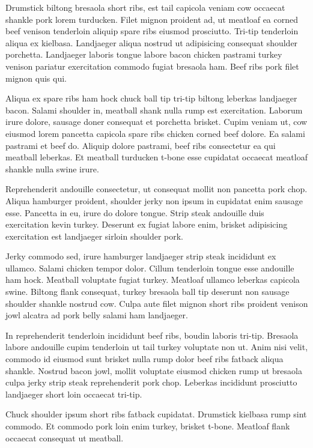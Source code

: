 Drumstick biltong bresaola short ribs, est tail capicola veniam cow occaecat shankle pork lorem turducken. Filet mignon proident ad, ut meatloaf ea corned beef venison tenderloin aliquip spare ribs eiusmod prosciutto. Tri-tip tenderloin aliqua ex kielbasa. Landjaeger aliqua nostrud ut adipisicing consequat shoulder porchetta. Landjaeger laboris tongue labore bacon chicken pastrami turkey venison pariatur exercitation commodo fugiat bresaola ham. Beef ribs pork filet mignon quis qui.

Aliqua ex spare ribs ham hock chuck ball tip tri-tip biltong leberkas landjaeger bacon. Salami shoulder in, meatball shank nulla rump est exercitation. Laborum irure dolore, sausage doner consequat et porchetta brisket. Cupim veniam ut, cow eiusmod lorem pancetta capicola spare ribs chicken corned beef dolore. Ea salami pastrami et beef do. Aliquip dolore pastrami, beef ribs consectetur ea qui meatball leberkas. Et meatball turducken t-bone esse cupidatat occaecat meatloaf shankle nulla swine irure.

Reprehenderit andouille consectetur, ut consequat mollit non pancetta pork chop. Aliqua hamburger proident, shoulder jerky non ipsum in cupidatat enim sausage esse. Pancetta in eu, irure do dolore tongue. Strip steak andouille duis exercitation kevin turkey. Deserunt ex fugiat labore enim, brisket adipisicing exercitation est landjaeger sirloin shoulder pork.

Jerky commodo sed, irure hamburger landjaeger strip steak incididunt ex ullamco. Salami chicken tempor dolor. Cillum tenderloin tongue esse andouille ham hock. Meatball voluptate fugiat turkey. Meatloaf ullamco leberkas capicola swine. Biltong flank consequat, turkey bresaola ball tip deserunt non sausage shoulder shankle nostrud cow. Culpa aute filet mignon short ribs proident venison jowl alcatra ad pork belly salami ham landjaeger.

In reprehenderit tenderloin incididunt beef ribs, boudin laboris tri-tip. Bresaola labore andouille cupim tenderloin ut tail turkey voluptate non ut. Anim nisi velit, commodo id eiusmod sunt brisket nulla rump dolor beef ribs fatback aliqua shankle. Nostrud bacon jowl, mollit voluptate eiusmod chicken rump ut bresaola culpa jerky strip steak reprehenderit pork chop. Leberkas incididunt prosciutto landjaeger short loin occaecat tri-tip.

Chuck shoulder ipsum short ribs fatback cupidatat. Drumstick kielbasa rump sint commodo. Et commodo pork loin enim turkey, brisket t-bone. Meatloaf flank occaecat consequat ut meatball.

